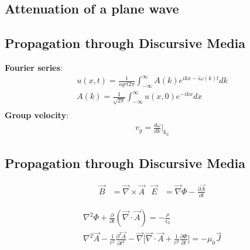 \documentclass[a4paper, 11pt, landscape]{article}
\begin{document}
\begin{multicols*}{3}
\subsection{Attenuation of a plane wave}
\begin{compactenum}

\end{compactenum}

\subsection{Propagation through Discursive Media}
\begin{compactenum}
\textbf{Fourier series}:
    \begin{align*}
        u(x,t) = \frac{1}{sqrt{2\pi}} \int_{-\infty}^{\infty} A(k)e^{ikx-i\omega(k)t}dk \\
        A(k) = \frac{1}{\sqrt{2\pi}}  \int_{-\infty}^{\infty} u(x,0)e^{-ikx} dx\\
         \end{align*}
    \textbf{Group velocity}:
     \begin{align*}
        v_{g} = \frac{d\omega}{dk}\Bigg|_{k_{0}}
    \end{align*}
\end{compactenum}

\subsection{Propagation through Discursive Media}
\begin{compactenum}
     \begin{align*}
        \vec{B} &= \vec{\nabla} \times \vec{A} &
        \vec{E} &= \vec{\nabla}\Phi - \frac{\partial \vec{A}}{\partial t} 
    \end{align*}
    \begin{center}
    \begin{align*}
        \nabla^{2}\Phi + \frac{\partial}{\partial t}(\vec{\nabla} \cdot \vec{A}) = -\frac{\rho}{\epsilon_{0}} \\
        \nabla^{2}\vec{A} - \frac{1}{c^{2}}\frac{\partial^{2} \vec{A}}{\partial t^{2}} - \vec{\nabla}\Big[ \vec{\nabla} \cdot \vec{A} + \frac{1}{c^{2}}\frac{\partial \Phi}{\partial t} \Big] = -\mu_{0} \vec{J}
    \end{align*}
    \end{center}
\end{compactenum}


\end{multicols*}
\end{document}
